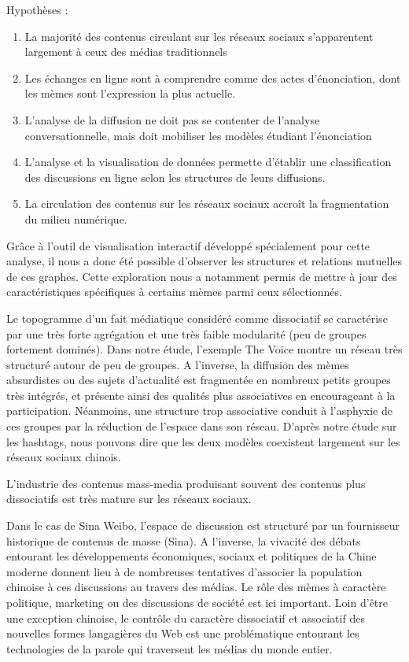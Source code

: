 Hypothèses :
\begin{enumerate}
    \item{La majorité des contenus circulant sur les réseaux sociaux s'apparentent largement à ceux des médias traditionnels} 
    \item{Les échanges en ligne sont à comprendre comme des actes d'énonciation, dont les mèmes sont l'expression la plus actuelle.}
    \item{L'analyse de la diffusion ne doit pas se contenter de l'analyse conversationnelle, mais doit mobiliser les modèles étudiant l'énonciation} 
    \item{L'analyse et la visualisation de données permette d'établir une classification des discussions en ligne selon les structures de leurs diffusions.}
    \item{La circulation des contenus sur les réseaux sociaux accroît la fragmentation du milieu numérique.}
\end{enumerate}




Gr\^ace à l{\textquoteright}outil de visualisation interactif développé spécialement pour cette analyse, il nous a donc été possible d{\textquoteright}observer les structures et relations mutuelles de ces graphes. Cette exploration nous a notamment permis de mettre à jour des caractéristiques spécifiques à certains mèmes parmi ceux sélectionnés.

Le topogramme d’un fait médiatique considéré comme dissociatif se caractérise par une très forte agrégation et une très faible modularité (peu de groupes fortement dominés). Dans notre étude, l’exemple The Voice montre un réseau très structuré autour de peu de groupes. A l’inverse, la diffusion des mèmes absurdistes ou des sujets d’actualité est fragmentée en nombreux petits groupes très intégrés, et présente ainsi des qualités plus associatives en encourageant à la participation. Néanmoins, une structure trop associative conduit à l’asphyxie de ces groupes par la réduction de l’espace dans son réseau. D’après notre étude sur les hashtags, nous pouvons dire que les deux modèles coexistent largement sur les réseaux sociaux chinois. 

L’industrie des contenus mass-media produisant souvent des contenus plus dissociatifs est très mature sur les réseaux sociaux. 

Dans le cas de Sina Weibo, l’espace de discussion est structuré par un fournisseur historique de contenus de masse (Sina). A l’inverse, la vivacité des débats entourant les développements économiques, sociaux et politiques de la Chine moderne donnent lieu à de nombreuses tentatives d’associer la population chinoise à ces discussions au travers des médias. Le rôle des mèmes à caractère politique, marketing ou des discussions de société est ici important. Loin d’être une exception chinoise, le contrôle du caractère dissociatif et associatif des nouvelles formes langagières du Web est une problématique entourant les technologies de la parole qui traversent les médias du monde entier.


